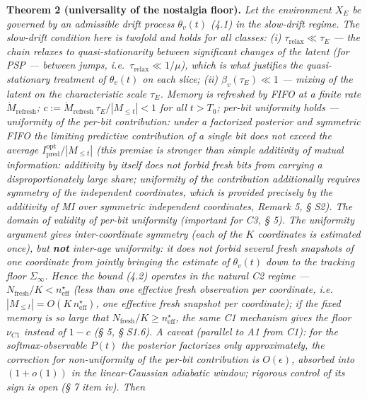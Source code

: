 \documentclass[12pt]{iopart}
\begin{document}
\textbf{Theorem 2 (universality of the nostalgia floor).} \emph{Let the environment \(X_E\) be governed by an admissible drift process \(\theta_v(t)\) (4.1) in the slow-drift regime. The slow-drift condition here is twofold and holds for all classes: (i) \(\tau_{\text{relax}} \ll \tau_E\) --- the chain relaxes to quasi-stationarity between significant changes of the latent (for PSP --- between jumps, i.e.~\(\tau_{\text{relax}} \ll 1/\mu\)), which is what justifies the quasi-stationary treatment of \(\theta_v(t)\) on each slice; (ii) \(\beta_v(\tau_E) \ll 1\) --- mixing of the latent on the characteristic scale \(\tau_E\). Memory is refreshed by FIFO at a finite rate \(\dot M_{\text{refresh}}\); \(c := \dot M_{\text{refresh}}\,\tau_E/|M_{\le t}| < 1\) for all \(t > T_0\); per-bit uniformity holds --- \emph{uniformity of the per-bit contribution}: under a factorized posterior and symmetric FIFO the limiting predictive contribution of a single bit does not exceed the average \(I^{\text{opt}}_{\text{pred}}/|M_{\le t}|\) (this premise is \emph{stronger} than simple additivity of mutual information: additivity by itself does not forbid fresh bits from carrying a disproportionately large share; uniformity of the contribution additionally requires symmetry of the independent coordinates, which is provided precisely by the additivity of MI over symmetric independent coordinates, \cite{Andriishin2026b} Remark 5, § S2). \emph{The domain of validity of per-bit uniformity (important for C3, § 5).} The uniformity argument gives \emph{inter-coordinate} symmetry (each of the \(K\) coordinates is estimated once), but \textbf{not} \emph{inter-age} uniformity: it does not forbid several fresh snapshots of one coordinate from \emph{jointly} bringing the estimate of \(\theta_v(t)\) down to the tracking floor \(\Sigma_\infty\). Hence the bound (4.2) operates in the \emph{natural C2 regime} --- \(N_{\text{fresh}}/K < n_{\text{eff}}^\star\) (less than one effective fresh observation per coordinate, i.e.~\(|M_{\le t}| = O(K\,n_{\text{eff}}^\star)\), one effective fresh snapshot per coordinate); if the fixed memory is so large that \(N_{\text{fresh}}/K \ge n_{\text{eff}}^\star\), the same C1 mechanism gives the floor \(\nu_{C1}\) instead of \(1-c\) (§ 5, § S1.6). A caveat (parallel to A1 from C1): for the softmax-observable \(P(t)\) the posterior factorizes only approximately, the correction for non-uniformity of the per-bit contribution is \(O(\epsilon)\), absorbed into \((1+o(1))\) in the linear-Gaussian adiabatic window; rigorous control of its sign is open (§ 7 item iv). Then}
\end{document}
